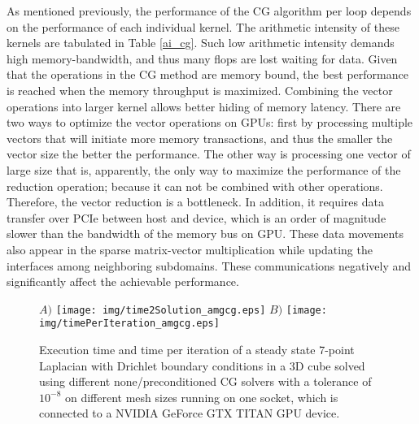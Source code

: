 \documentclass[3p,times]{elsarticle}
\begin{document}
As mentioned previously, the performance of the CG algorithm per loop depends on the performance of each individual kernel. The arithmetic intensity of these kernels are tabulated in Table \ref{ai_cg}. Such low arithmetic intensity demands high memory-bandwidth, and thus many flops are lost waiting for data. Given that the operations in the CG method are memory bound, the best performance is reached when the memory throughput is maximized. Combining the vector operations into larger kernel allows better hiding of memory latency. There are two ways to optimize the vector operations on GPUs: first by processing multiple vectors that will initiate more memory transactions, and thus the smaller the vector size the better the performance. The other way is processing one vector of large size that is, apparently, the only way to maximize the performance of the reduction operation; because it can not be combined with other operations. Therefore, the vector reduction is a bottleneck. In addition, it requires data transfer over PCIe between host and device, which is an order of magnitude slower than the bandwidth of the memory bus on GPU. These data movements also appear in the sparse matrix-vector multiplication while updating the interfaces among neighboring subdomains. These communications negatively and significantly affect the achievable performance.     
~\\



\begin{figure}[h!]
\begin{center}
\emph{$A)$} \texttt{[image: img/time2Solution\_amgcg.eps]}
\emph{$B)$} \texttt{[image: img/timePerIteration\_amgcg.eps]}
\caption{Execution time and time per iteration of a steady state 7-point Laplacian with Drichlet boundary conditions in a 3D cube solved using different none/preconditioned CG solvers with a tolerance of $10^{-8}$ on different mesh sizes running on one socket, which is connected to a NVIDIA GeForce GTX TITAN GPU device.}
\label{pcgs1}
\end{center}
\end{figure} 
\end{document}
